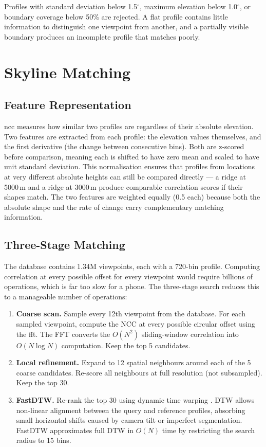 Profiles with standard deviation below 1.5$^\circ$, maximum elevation below 1.0$^\circ$, or boundary coverage below 50\% are rejected. A flat profile contains little information to distinguish one viewpoint from another, and a partially visible boundary produces an incomplete profile that matches poorly.

\section{Skyline Matching}
\label{sec:matching}

\subsection{Feature Representation}

\Gls{ncc} measures how similar two profiles are regardless of their absolute elevation. Two features are extracted from each profile: the elevation values themselves, and the first derivative (the change between consecutive bins). Both are z-scored before comparison, meaning each is shifted to have zero mean and scaled to have unit standard deviation. This normalisation ensures that profiles from locations at very different absolute heights can still be compared directly --- a ridge at 5000\,m and a ridge at 3000\,m produce comparable correlation scores if their shapes match. The two features are weighted equally (0.5 each) because both the absolute shape and the rate of change carry complementary matching information.

\subsection{Three-Stage Matching}

The database contains 1.34M viewpoints, each with a 720-bin profile. Computing correlation at every possible offset for every viewpoint would require billions of operations, which is far too slow for a phone. The three-stage search reduces this to a manageable number of operations:

\begin{enumerate}
    \item \textbf{Coarse scan.} Sample every 12th viewpoint from the database. For each sampled viewpoint, compute the NCC at every possible circular offset using the \Gls{fft}. The FFT converts the $O(N^2)$ sliding-window correlation into $O(N \log N)$ computation. Keep the top 5 candidates.
    \item \textbf{Local refinement.} Expand to 12 spatial neighbours around each of the 5 coarse candidates. Re-score all neighbours at full resolution (not subsampled). Keep the top 30.
    \item \textbf{FastDTW.} Re-rank the top 30 using dynamic time warping \cite{salvador2007fastdtw}. DTW allows non-linear alignment between the query and reference profiles, absorbing small horizontal shifts caused by camera tilt or imperfect segmentation. FastDTW approximates full DTW in $O(N)$ time by restricting the search radius to 15 bins.
\end{enumerate}

